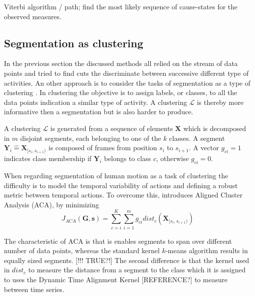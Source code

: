 Viterbi algorithm / path; find the most likely sequence of cause-states for 
the observed measures.





\subsection{Segmentation as clustering}
In the previous section the discussed methods all relied on the stream of data 
points and tried to find cuts the discriminate between successive different 
type of activities. An other approach is to consider the tasks of segmentation 
as a type of clustering \cite{zhou2008aligned}. In clustering the objective is 
to assign labels, or classes, to all the data points indication a similar type 
of activity. A clustering $\mathcal{L}$ is thereby more informative then a 
segmentation but is also harder to produce.

A clustering $\mathcal{L}$ is generated from a sequence of elements 
$\mathbf{X}$ which is decomposed in $m$ disjoint segments, each belonging to 
one of the $k$ classes. A segment $\mathbf{Y}_i \hat{=} 
\mathbf{X}_{[s_i,s_{i+1})}$ is composed of frames from position $s_i$ to 
$s_{i+1}$. A vector $g_{ci} = 1$ indicates class membership if $\mathbf{Y}_i$ 
belongs to class $c$, otherwise $g_{ci} = 0$.

When regarding segmentation of human motion as a task of clustering the 
difficulty is to model the temporal variability of actions 
and defining a robust metric between temporal actions. To overcome this, 
\cite{zhou2008aligned} introduces Aligned Cluster Analysis (ACA), by minimizing
\begin{equation} \label{eq:ACA}
J_{\mathit{ACA}}(\mathbf{G},\mathbf{s}) = 
\sum_{c=i}^{K} \sum_{i=1}^{m} g_{ci} \mathit{dist}_c 
(\mathbf{X}_{[s_i,s_{i+1})})
\end{equation}

The characteristic of ACA is that is enables segments to span over different 
number of data points, whereas the standard kernel $k$-means algorithm results 
in equally sized segments. [!!! TRUE?!] The second difference is that the 
kernel used in $\mathit{dist}_c$ to measure the distance from a segment to the 
class which it is assigned to uses the Dynamic Time Alignment Kernel 
[REFERENCE?] to measure between time series.


